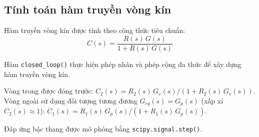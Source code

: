 \documentclass[../main.tex]{subfiles}
\begin{document}
\subsection{Tính toán hàm truyền vòng kín}

Hàm truyền vòng kín được tính theo công thức tiêu chuẩn:
\begin{equation}
    C(s) = \frac{R(s)\,G(s)}{1 + R(s)\,G(s)}
    \label{eq:closed_loop}
\end{equation}

Hàm {\footnotesize\texttt{closed\_loop()}} thực hiện phép nhân và phép cộng đa thức để xây dựng hàm truyền vòng kín.

Vòng trong được đóng trước: $C_2(s) = R_2(s)\,G_v(s) / (1 + R_2(s)\,G_v(s))$. Vòng ngoài sử dụng đối tượng tương đương $G_{eq}(s) = G_p(s)$ (xấp xỉ $C_2(s) \approx 1$): $C_1(s) = R_1(s)\,G_p(s) / (1 + R_1(s)\,G_p(s))$.

Đáp ứng bậc thang được mô phỏng bằng {\footnotesize\texttt{scipy.signal.step()}}.
\end{document}
